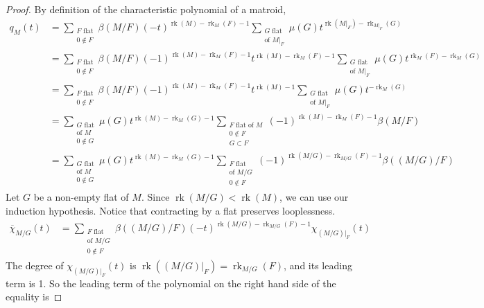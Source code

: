 \documentclass[12pt,a4paper,english]{scrartcl}
\DeclareMathOperator{\rank}{rk}
\begin{document}
\begin{proof}
By definition of the characteristic polynomial of a matroid,
\begin{equation}\label{eq: intermediateqM}
    \begin{split}
    q_M(t) & = \sum_{\substack{F \text{ flat} \\ 0\notin F}}\beta(M/F)(-t)^{\rank(M)-\rank_M(F)-1}\sum_{\substack{G \text{ flat} \\ \text{of } M|_F}}   \mu(G) t^{\rank(M|_F) - \rank_{M|_F}(G)}
     \\ & = \sum_{\substack{F \text{ flat} \\ 0\notin F}}\beta(M/F)(-1)^{\rank(M)-\rank_M(F)-1} t^{\rank(M)-\rank_M(F)-1}\sum_{\substack{G \text{ flat} \\ \text{of } M|_F}}   \mu(G) t^{\rank_M(F) - \rank_M(G)}
     \\ & = \sum_{\substack{F \text{ flat} \\ 0\notin F}}\beta(M/F) (-1)^{\rank(M)-\rank_M(F)-1} t^{\rank(M)-1}\sum_{\substack{G \text{ flat} \\ \text{of } M|_F}}  \mu(G) t^{- \rank_M(G)}
     \\ & = \sum_{\substack{G \text{ flat} \\ \text{of } M \\ 0\notin G}} \mu(G) t^{\rank(M) - \rank_M(G) - 1} \sum_{\substack{F \text{ flat of } M \\ 0\notin F \\ G \subset F}}(-1)^{\rank(M)-\rank_M(F)-1} \beta(M/F)
     \\ & = \sum_{\substack{G \text{ flat} \\ \text{of } M \\ 0\notin G}} \mu(G) t^{\rank(M) - \rank_M(G) - 1} \sum_{\substack{F \text{ flat}  \\\text{of } M/G \\ 0\notin F}}(-1)^{\rank(M/G)-\rank_{M/G}(F)-1} \beta((M/G)/F)
     \end{split}
\end{equation}
Let $G$ be a non-empty flat of $M$. Since $\rank(M/G)< \rank(M)$, we can use our induction hypothesis. Notice that contracting by a flat preserves looplessness.
\begin{align*}
     \overline{\chi}_{M/G}(t) &= \sum_{\substack{F \text{ flat} \\ \text{of } M/G  \\ 0\notin F}}\beta((M/G)/F)(-t)^{\rank(M/G)-\rank_{M/G}(F)-1}\chi_{(M/G)|_F}(t) 
\end{align*}
The degree of $\chi_{(M/G)|_F}(t)$ is $\rank((M/G)|_F) = \rank_{M/G}(F)$, and its leading term is 1. So the leading term of the polynomial on the right hand side of the equality is 

\end{proof}
\end{document}
